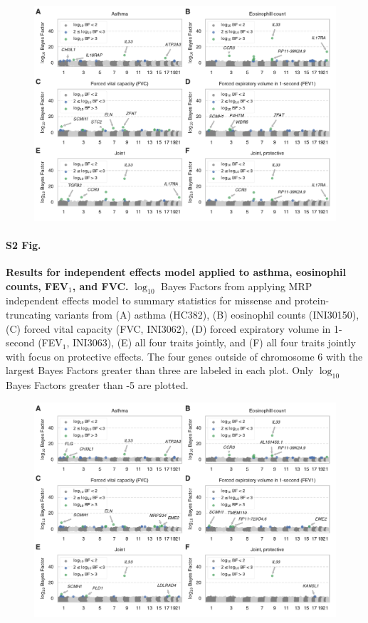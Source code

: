 \begin{figure}[H]
\includegraphics[width=\textwidth]{../figures/Figure_S02.pdf}
\end{figure}
\paragraph*{S2 Fig.}
\label{asthma_independent}
{\bf Results for independent effects model applied to asthma, eosinophil counts, FEV$_1$, and FVC.} $\log_{10}$ Bayes Factors from applying MRP independent effects model to summary statistics for missense and protein-truncating variants from (A) asthma (HC382), (B) eosinophil counts (INI30150), (C) forced vital capacity (FVC, INI3062), (D) forced expiratory volume in 1-second (FEV$_1$, INI3063), (E) all four traits jointly, and (F) all four traits jointly with focus on protective effects. The four genes outside of chromosome 6 with the largest Bayes Factors greater than three are labeled in each plot. Only $\log_{10}$ Bayes Factors greater than -5 are plotted.

\begin{figure}[H]
\includegraphics[width=\textwidth]{../figures/Figure_S03.pdf}
\end{figure}
